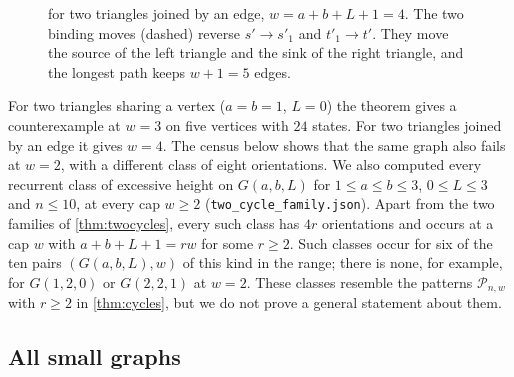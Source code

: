 \documentclass[11pt,a4paper]{article}
\theoremstyle{plain}
\theoremstyle{plain}
\newcommand{\Pat}{\mathcal{P}}
\begin{document}
\begin{figure}[t]
\centering
{}
\caption{ for two triangles joined by an edge, $w=a+b+L+1=4$. The two binding moves (dashed) reverse $s'\to s'_1$ and $t'_1\to t'$. They move the source of the left triangle and the sink of the right triangle, and the longest path keeps $w+1=5$ edges.}
\label{fig:twocycles}
\end{figure}

For two triangles sharing a vertex ($a=b=1$, $L=0$) the theorem gives a counterexample at $w=3$ on five vertices with $24$ states. For two triangles joined by an edge it gives $w=4$. The census below shows that the same graph also fails at $w=2$, with a different class of eight orientations. We also computed every recurrent class of excessive height on $G(a,b,L)$ for $1\le a\le b\le3$, $0\le L\le3$ and $n\le10$, at every cap $w\ge2$ (\texttt{two\_cycle\_family.json}). Apart from the two families of \cref{thm:twocycles}, every such class has $4r$ orientations and occurs at a cap $w$ with $a+b+L+1=rw$ for some $r\ge2$. Such classes occur for six of the ten pairs $(G(a,b,L),w)$ of this kind in the range; there is none, for example, for $G(1,2,0)$ or $G(2,2,1)$ at $w=2$. These classes resemble the patterns $\Pat_{n,w}$ with $r\ge2$ in \cref{thm:cycles}, but we do not prove a general statement about them.

\subsection{All small graphs}\label{sec:census}
\end{document}
